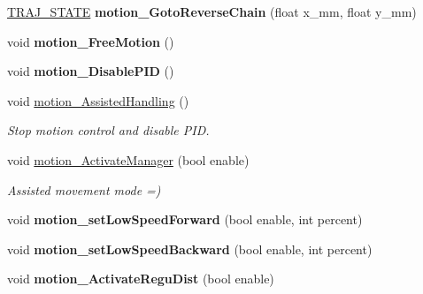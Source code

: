 \begin{DoxyCompactItemize}
\item 
\mbox{\label{classAsservDriver_a724a7b68fdf74793ee2d159f82fe50e5}} 
\hyperlink{path__manager_8h_adb3360abeb29758da93865c8afcb80eb}{T\+R\+A\+J\+\_\+\+S\+T\+A\+TE} {\bfseries motion\+\_\+\+Goto\+Reverse\+Chain} (float x\+\_\+mm, float y\+\_\+mm)
\item 
\mbox{\label{classAsservDriver_aac603258c40d4c9aede0e5fce6ed4dea}} 
void {\bfseries motion\+\_\+\+Free\+Motion} ()
\item 
\mbox{\label{classAsservDriver_a0a68a702d1fea277c2e24e6dceb2d646}} 
void {\bfseries motion\+\_\+\+Disable\+P\+ID} ()
\item 
\mbox{\label{classAsservDriver_a733d0cddfdb612cea9e8097b348537f1}} 
void \hyperlink{classAsservDriver_a733d0cddfdb612cea9e8097b348537f1}{motion\+\_\+\+Assisted\+Handling} ()
\begin{DoxyCompactList}\small\item\em Stop motion control and disable P\+ID. \end{DoxyCompactList}\item 
\mbox{\label{classAsservDriver_aaeb3c80c8a079c812af38273f825c537}} 
void \hyperlink{classAsservDriver_aaeb3c80c8a079c812af38273f825c537}{motion\+\_\+\+Activate\+Manager} (bool enable)
\begin{DoxyCompactList}\small\item\em Assisted movement mode =) \end{DoxyCompactList}\item 
\mbox{\label{classAsservDriver_a17a6651fc8ecebafc085c46af984b099}} 
void {\bfseries motion\+\_\+set\+Low\+Speed\+Forward} (bool enable, int percent)
\item 
\mbox{\label{classAsservDriver_ac01272d7ef32443b3c283186041324c3}} 
void {\bfseries motion\+\_\+set\+Low\+Speed\+Backward} (bool enable, int percent)
\item 
\mbox{\label{classAsservDriver_a48e4f69bf857d6a18098dc48615a61f1}} 
void {\bfseries motion\+\_\+\+Activate\+Regu\+Dist} (bool enable)
\item 

\end{DoxyCompactItemize}
